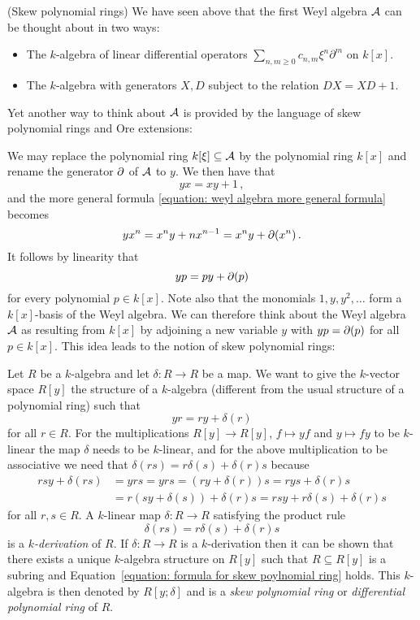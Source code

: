 \begin{remark}(Skew polynomial rings)
  \label{remark: skew polynomial rings}
  We have seen above that the first Weyl algebra $\operatorname{\mathcal{A}}$ can be thought about in two ways:
  \begin{itemize}
    \item
      The $k$-algebra of linear differential operators $\sum_{n,m \geq 0} c_{n,m} \xi^n \partial^m$ on $k[x]$.
    \item
      The $k$-algebra with generators $X, D$ subject to the relation $DX = X D + 1$.
  \end{itemize}
  Yet another way to think about $\operatorname{\mathcal{A}}$ is provided by the language of skew polynomial rings and Ore extensions:
  
  We may replace the polynomial ring $k[\xi] \subseteq \operatorname{\mathcal{A}}$ by the polynomial ring $k[x]$ and rename the generator $\partial$ of $\operatorname{\mathcal{A}}$ to $y$.
  We then have that
  \[
    yx = xy + 1 \,,
  \]
  and the more general formula \eqref{equation: weyl algebra more general formula} becomes
  \[
      y x^n
    = x^n y + n x^{n-1}
    = x^n y + \partial(x^n) \,.
  \]
  It follows by linearity that
  \[
      y p
    = p y + \partial(p)
  \]
  for every polynomial $p \in k[x]$.
  Note also that the monomials $1, y, y^2, \dotsc$ form a $k[x]$-basis of the Weyl algebra.
  We can therefore think about the Weyl algebra $\operatorname{\mathcal{A}}$ as resulting from $k[x]$ by adjoining a new variable $y$ with $y p = \partial(p)$ for all $p \in k[x]$.
  This idea leads to the notion of skew polynomial rings:
  
  Let $R$ be a $k$-algebra and let $\delta \colon R \to R$ be a map.
  We want to give the $k$-vector space $R[y]$ the structure of a $k$-algebra (different from the usual structure of a polynomial ring) such that
  \begin{equation}
    \label{equation: formula for skew poylnomial ring}
      y r
    = r y + \delta(r)
  \end{equation}
  for all $r \in R$.
  For the multiplications $R[y] \to R[y]$, $f \mapsto yf$ and $y \mapsto fy$ to be $k$-linear the map $\delta$ needs to be $k$-linear, and for the above multiplication to be associative we need that $\delta(rs) = r \delta(s) + \delta(r) s$ because
  \begin{align*}
        rs y + \delta(rs)
    &=  y rs
     =  y r s
     =  (r y + \delta(r)) s
     =  r y s + \delta(r) s
    \\
    &=  r (s y + \delta(s)) + \delta(r) s
     =  r s y + r \delta(s) + \delta(r) s
  \end{align*}
  for all $r, s \in R$.
  A $k$-linear map $\delta \colon R \to R$ satisfying the product rule
  \[
    \delta(rs) = r \delta(s) + \delta(r) s
  \]
  is a \emph{$k$-derivation} of $R$.
  If $\delta \colon R \to R$ is a $k$-derivation then it can be shown that there exists a unique $k$-algebra structure on $R[y]$ such that $R \subseteq R[y]$ is a subring and Equation~\ref{equation: formula for skew poylnomial ring} holds.
  This $k$-algebra is then denoted by $R[y;\delta]$ and is a \emph{skew polynomial ring} or \emph{differential polynomial ring} of $R$.
  

\end{remark}
